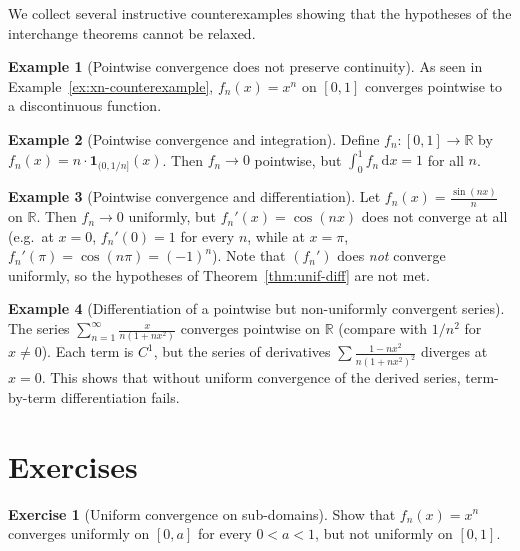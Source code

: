 \documentclass[12pt,a4paper]{book}
\theoremstyle{definition}
\newtheorem{example}{Example}[chapter]
\newtheorem{exercise}{Exercise}[chapter]
\newcommand{\R}{\mathbb{R}}
\newcommand{\dd}{\,\mathrm{d}}
\begin{document}
We collect several instructive counterexamples showing that the
hypotheses of the interchange theorems cannot be relaxed.

\begin{example}[Pointwise convergence does not preserve continuity]\label{ex:counter-cont}
  As seen in Example~\ref{ex:xn-counterexample}, $f_n(x)=x^n$ on $[0,1]$
  converges pointwise to a discontinuous function.
\end{example}

\begin{example}[Pointwise convergence and integration]\label{ex:counter-int}
  Define $f_n\colon[0,1]\to\R$ by $f_n(x)=n\cdot\mathbf{1}_{(0,1/n]}(x)$.
  Then $f_n\to0$ pointwise, but $\int_0^1 f_n\dd x=1$ for all $n$.
\end{example}

\begin{example}[Pointwise convergence and differentiation]\label{ex:counter-diff}
  Let $f_n(x)=\frac{\sin(nx)}{n}$ on $\R$.  Then $f_n\to0$ uniformly,
  but $f_n'(x)=\cos(nx)$ does not converge at all (e.g.\ at $x=0$,
  $f_n'(0)=1$ for every $n$, while at $x=\pi$, $f_n'(\pi)=\cos(n\pi)=(-1)^n$).
  Note that $(f_n')$ does \emph{not} converge uniformly, so the
  hypotheses of Theorem~\ref{thm:unif-diff} are not met.
\end{example}

\begin{example}[Differentiation of a pointwise but non-uniformly convergent series]\label{ex:counter-series-diff}
  The series $\sum_{n=1}^{\infty}\frac{x}{n(1+nx^2)}$ converges
  pointwise on $\R$ (compare with $1/n^2$ for $x\ne0$).  Each term is
  $C^1$, but the series of derivatives
  $\sum\frac{1-nx^2}{n(1+nx^2)^2}$ diverges at $x=0$.  This shows that
  without uniform convergence of the derived series, term-by-term
  differentiation fails.
\end{example}


\section{Exercises}\label{sec:exer-ch8}

\begin{exercise}[Uniform convergence on sub-domains]\label{exo:exer-unif-sub}
  Show that $f_n(x)=x^n$ converges uniformly on $[0,a]$ for every
  $0<a<1$, but not uniformly on $[0,1]$.
\end{exercise}
\end{document}
